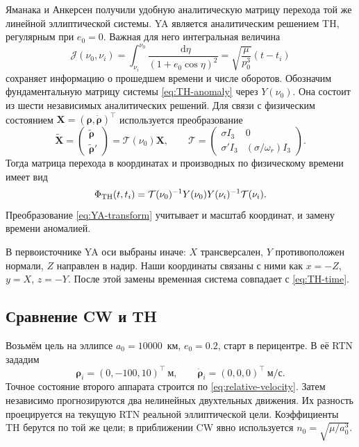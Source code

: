 \documentclass[a4paper,11pt]{article}
\newcommand{\dd}{\mathop{}\!\mathrm d}
\numberwithin{equation}{section}
\theoremstyle{remark}
\newcommand{\vect}[1]{\boldsymbol{#1}}
\begin{document}
Яманака и Анкерсен \cite{ya} получили удобную аналитическую
матрицу перехода той же линейной эллиптической системы.
YA является аналитическим решением TH, регулярным при $e_0=0$.
Важная для него интегральная величина
\begin{equation}
 \mathcal J(\nu_0,\nu_i)
 =\int_{\nu_i}^{\nu_0}\frac{\dd\eta}{(1+e_0\cos\eta)^2}
 =\sqrt{\frac{\mu}{p_0^3}}(t-t_i)
 \label{eq:YA-J}
\end{equation}
сохраняет информацию о прошедшем времени и числе оборотов.
Обозначим фундаментальную матрицу системы
\eqref{eq:TH-anomaly} через $Y(\nu_0)$.
Она состоит из шести независимых аналитических решений.
Для связи с физическим состоянием
$\vect X=(\vect\rho,\dot{\vect\rho})^\top$ используется
преобразование
\begin{equation}
 \widetilde{\vect X}=
 \begin{pmatrix}\widetilde{\vect\rho}\\
                 \widetilde{\vect\rho}'\end{pmatrix}
 =\mathcal T(\nu_0)\vect X,
 \qquad
 \mathcal T=
 \begin{pmatrix}
 \sigma I_3&0\\
 \sigma'I_3&(\sigma/\omega_r)I_3
 \end{pmatrix}.
 \label{eq:YA-transform}
\end{equation}
Тогда матрица перехода в координатах и производных
по физическому времени имеет вид
\begin{equation}
 \Phi_{\rm TH}(t,t_i)=
 \mathcal T(\nu_0)^{-1}Y(\nu_0)Y(\nu_i)^{-1}
                              \mathcal T(\nu_i).
 \label{eq:YA-STM-concept}
\end{equation}
Преобразование \eqref{eq:YA-transform} учитывает и масштаб
координат, и замену времени аномалией.

В первоисточнике YA оси выбраны иначе: $X$ трансверсален,
$Y$ противоположен нормали, $Z$ направлен в надир.
Наши координаты связаны с ними как
$x=-Z$, $y=X$, $z=-Y$. После этой замены временная система совпадает с
\eqref{eq:TH-time}.

\subsection{Сравнение CW и TH}

Возьмём цель на эллипсе $a_0=10000$~км, $e_0=0.2$,
старт в перицентре. В её RTN зададим
\[
 \vect\rho_i=(0,-100,10)^\top\ \text{м},\qquad
 \dot{\vect\rho}_i=(0,0,0)^\top\ \text{м/с}.
\]
Точное состояние второго аппарата строится по
\eqref{eq:relative-velocity}. Затем независимо прогнозируются
два нелинейных двухтельных движения. Их разность проецируется
на текущую RTN реальной эллиптической цели.
Коэффициенты TH берутся по той же цели;
в приближении CW явно используется $n_0=\sqrt{\mu/a_0^3}$.
\end{document}
